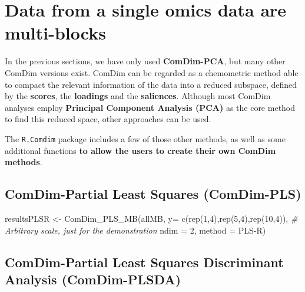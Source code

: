 \documentclass[
]{book}
\newenvironment{Shaded}{\begin{snugshade}}{\end{snugshade}}
\newcommand{\AttributeTok}[1]{\textcolor[rgb]{0.77,0.63,0.00}{#1}}
\newcommand{\CommentTok}[1]{\textcolor[rgb]{0.56,0.35,0.01}{\textit{#1}}}
\newcommand{\DecValTok}[1]{\textcolor[rgb]{0.00,0.00,0.81}{#1}}
\newcommand{\FunctionTok}[1]{\textcolor[rgb]{0.00,0.00,0.00}{#1}}
\newcommand{\NormalTok}[1]{#1}
\newcommand{\OtherTok}[1]{\textcolor[rgb]{0.56,0.35,0.01}{#1}}
\newcommand{\StringTok}[1]{\textcolor[rgb]{0.31,0.60,0.02}{#1}}
\begin{document}
\hypertarget{Section6}{%
\chapter{Data from a single omics data are multi-blocks}\label{Section6}}

In the previous sections, we have only used \textbf{ComDim-PCA}, but many other
ComDim versions exist. ComDim can be regarded as a chemometric method able to
compact the relevant information of the data into a reduced subspace, defined by
the \textbf{scores}, the \textbf{loadings} and the \textbf{saliences}.
Although most ComDim analyses employ \textbf{Principal Component Analysis (PCA)} as
the core method to find this reduced space, other approaches can be used.

The \texttt{R.Comdim} package includes a few of those other methods, as well as some
additional functions \textbf{to allow the users to create their own ComDim methods}.

\hypertarget{PLS}{%
\section{ComDim-Partial Least Squares (ComDim-PLS)}\label{PLS}}

\begin{Shaded}
\begin{Highlighting}[]
\NormalTok{resultsPLSR }\OtherTok{\textless{}{-}} \FunctionTok{ComDim\_PLS\_MB}\NormalTok{(allMB,}
                             \AttributeTok{y=} \FunctionTok{c}\NormalTok{(}\FunctionTok{rep}\NormalTok{(}\DecValTok{1}\NormalTok{,}\DecValTok{4}\NormalTok{),}\FunctionTok{rep}\NormalTok{(}\DecValTok{5}\NormalTok{,}\DecValTok{4}\NormalTok{),}\FunctionTok{rep}\NormalTok{(}\DecValTok{10}\NormalTok{,}\DecValTok{4}\NormalTok{)),}
                             \CommentTok{\# Arbitrary scale, just for the demonstration}
                             \AttributeTok{ndim =} \DecValTok{2}\NormalTok{, }\AttributeTok{method =} \StringTok{\textquotesingle{}PLS{-}R\textquotesingle{}}\NormalTok{)}
\end{Highlighting}
\end{Shaded}

\hypertarget{PLS-DA}{%
\section{ComDim-Partial Least Squares Discriminant Analysis (ComDim-PLSDA)}\label{PLS-DA}}
\end{document}
